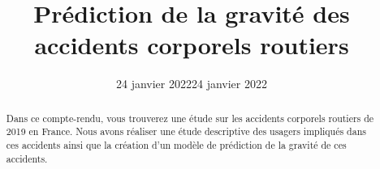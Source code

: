 \documentclass[french,]{tp}
\title{Prédiction de la gravité des accidents corporels routiers}
\author{}
\date{24 janvier 2022}
\date{24 janvier 2022}
\begin{document}

\thispagestyle{plain}
\maketitle


\begin{abstract}
Dans ce compte-rendu, vous trouverez une étude sur les accidents corporels routiers de 2019 en France.
Nous avons réaliser une étude descriptive des usagers impliqués dans ces accidents ainsi que la création d'un modèle de prédiction de la gravité de ces accidents.
\end{abstract}



{
\hypersetup{linkcolor=black}
\setcounter{tocdepth}{3}
\tableofcontents
}
\end{document}
